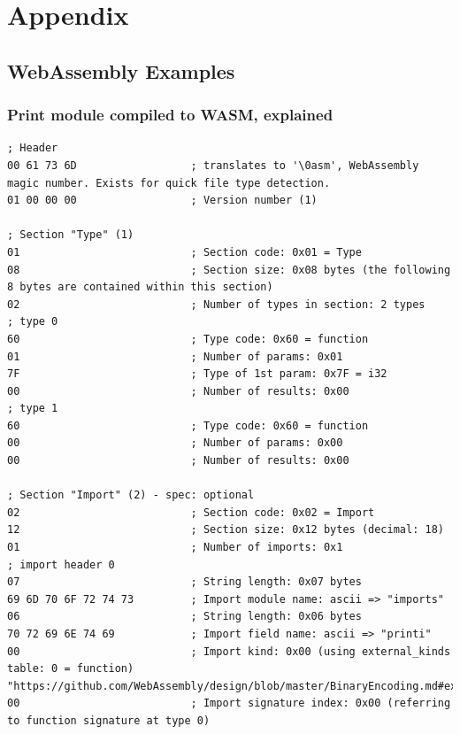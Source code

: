 \documentclass[a4paper]{article}
\begin{document}
\newpage
\section{Appendix}
\label{sec:appendix}

\subsection{WebAssembly Examples}
\label{sec:appendix:wasm-examples}

\subsubsection{Print module compiled to WASM, explained}
\label{sec:appendix:wasm-examples:binary-print}
\begin{verbatim}
; Header
00 61 73 6D                  ; translates to '\0asm', WebAssembly magic number. Exists for quick file type detection.
01 00 00 00                  ; Version number (1)

; Section "Type" (1)
01                           ; Section code: 0x01 = Type
08                           ; Section size: 0x08 bytes (the following 8 bytes are contained within this section)
02                           ; Number of types in section: 2 types
; type 0
60                           ; Type code: 0x60 = function
01                           ; Number of params: 0x01
7F                           ; Type of 1st param: 0x7F = i32
00                           ; Number of results: 0x00
; type 1
60                           ; Type code: 0x60 = function
00                           ; Number of params: 0x00
00                           ; Number of results: 0x00

; Section "Import" (2) - spec: optional
02                           ; Section code: 0x02 = Import
12                           ; Section size: 0x12 bytes (decimal: 18)
01                           ; Number of imports: 0x1
; import header 0
07                           ; String length: 0x07 bytes
69 6D 70 6F 72 74 73         ; Import module name: ascii => "imports"
06                           ; String length: 0x06 bytes
70 72 69 6E 74 69            ; Import field name: ascii => "printi"
00                           ; Import kind: 0x00 (using external_kinds table: 0 = function) "https://github.com/WebAssembly/design/blob/master/BinaryEncoding.md#external_kind"
00                           ; Import signature index: 0x00 (referring to function signature at type 0)


\end{verbatim}
\end{document}
